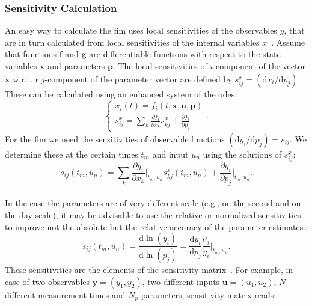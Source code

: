 \documentclass[graybox]{svmult}
\newcommand{\mbx}{\mathbf{x}}
\newcommand{\mbu}{\mathbf{u}}
\newcommand{\mbp}{\mathbf{p}}
\newcommand{\mby}{\mathbf{y}}
\newcommand{\mbg}{\mathbf{g}}
\newcommand{\mbf}{\mathbf{f}}
\begin{document}
\subsubsection{Sensitivity Calculation}
An easy way to calculate the \ac{fim} uses local sensitivities of the observables $y$, that are in turn calculated from local sensitivities of the internal variables $x$~\cite{versyckIntroducingOptimal1999, banks_generalized_2010}.
Assume that functions $\mbf$ and $\mbg$ are differentiable functions with respect to the state variables $\mbx$ and parameters $\mbp$.
The local sensitivities of $i$-component of the vector $\mbx$ w.r.t. r $j$-component of the parameter vector are defined by $s^x_{ij} = (\mathrm{d} x_i / \mathrm{d} p_j)$.
These can be calculated using an enhanced system of the \acp{ode}:
\begin{equation}
    \begin{cases}
    \dot x_i (t) = f_i(t, \mbx, \mbu, \mbp)\\
    \dot s^x_{ij} = \sum_k \frac{\partial f_i}{\partial x_k} s^x_{kj} + \frac{\partial f_i}{\partial p_j}
    \end{cases}.
\label{eq:ode_and_sensitiv}
\end{equation}
For the \ac{fim} we need the sensitivities of observable functions $(\mathrm{d} y_i / \mathrm{d} p_j) = s_{ij}$.
We determine these at the certain times $t_m$ and input $u_n$ using the solutions of $s^x_{ij}$:
\begin{equation}
    s_{ij} (t_m, u_n) = \sum_k \frac{\partial g_i}{\partial x_k}\bigg|_{t_m, u_n} s_{kj}^x (t_m, u_n) + \frac{\partial g_i}{\partial p_j}\bigg|_{t_m, u_n}.
\label{eq:observ_sensitivities}
\end{equation}
\\
In the case the parameters are of very different scale (e.g., on the second and on the day scale), it may be advisable to use the relative or normalized sensitivities to improve not the absolute but the relative accuracy of the parameter estimates.:
\begin{equation}
    \tilde{s}_{ij} (t_m, u_n) =\frac{\mathrm{d}\ln(y_i)}{\mathrm{d}\ln(p_j)} = \frac{\mathrm{d} y_i}{\mathrm{d} p_j} \frac{p_j}{y_i}\bigg|_{t_m, u_n}.
\label{eq:relat_sensitivities}
\end{equation}
These sensitivities are the elements of the sensitivity matrix~\cite{stigterObservabilityComplex2017}.
For example, in case of two observables $\mby = (y_1, y_2)$, two different inputs $\mbu = (u_1, u_2)$, $N$ different measurement times and $N_p$ parameters, sensitivity matrix reads:
\end{document}
